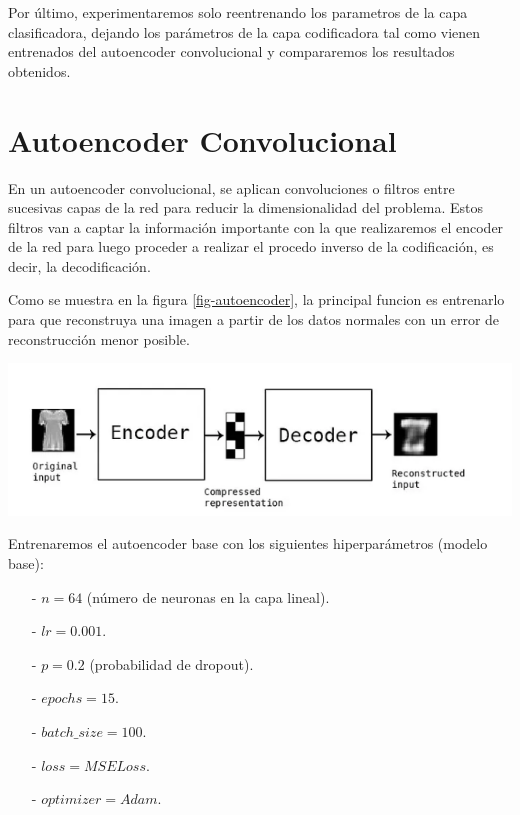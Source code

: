 \documentclass[aps,prl,reprint,groupedaddress]{revtex4-2}
\newenvironment{Figura}
  {\par\medskip\noindent\minipage{\linewidth}}
  {\endminipage\par\medskip}
\begin{document}
Por último, experimentaremos solo reentrenando los parametros de la capa 
clasificadora, dejando los parámetros de la capa codificadora tal como 
vienen entrenados del autoencoder convolucional y compararemos los resultados 
obtenidos.

\section{Autoencoder Convolucional}
En un autoencoder convolucional, se aplican convoluciones o filtros entre 
sucesivas capas de la red para reducir la dimensionalidad del problema. Estos 
filtros van a captar la información importante con la que realizaremos el encoder 
de la red para luego proceder a realizar el procedo inverso de la codificación,
es decir, la decodificación.

Como se muestra en la figura \ref{fig-autoencoder}, la principal funcion es 
entrenarlo para que reconstruya una imagen a partir de los datos normales con 
un error de reconstrucción menor posible. 

\begin{Figura}
  \centering
  \includegraphics[width=1\textwidth]{figs/ejem_encoder_decoder.png}
  \label{fig-autoencoder}
\end{Figura}

Entrenaremos el autoencoder base con los siguientes hiperparámetros (modelo 
base):
\begin{itemize}
  \item [-] $n = 64$ (número de neuronas en la capa lineal).
  \item [-] $lr = 0.001$.
  \item [-] $p = 0.2$ (probabilidad de dropout).
  \item [-] $epochs = 15$.
  \item [-] $batch\_size = 100$.
  \item [-] $loss = MSELoss$.
  \item [-] $optimizer = Adam$.
\end{itemize}
\end{document}
